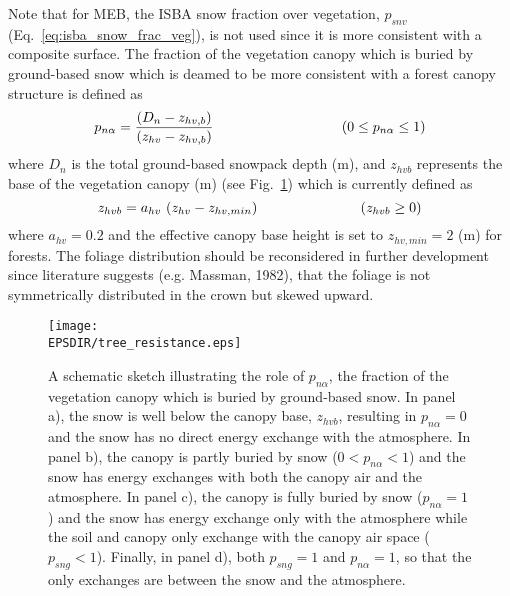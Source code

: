Note that for MEB, the ISBA snow fraction over vegetation, 
$p_{snv}$ (Eq.~\ref{eq:isba_snow_frac_veg}), 
is not used since it is
more consistent with a composite surface.
The fraction of the vegetation canopy which is buried by ground-based snow
which is deamed to be more consistent with a forest canopy structure
is defined as 
%
\begin{equation}
\label{eq:meb_LAIcansnow}
p_{n\alpha} = 
\frac
{\left(D_n - z_{hv,b}\right)}
{\left(z_{hv} - z_{hv,b}\right)}
\hskip1.25in
\left( 0 \leq  p_{n\alpha} \leq 1\right)
\end{equation}
%
where $D_n$ is the total ground-based snowpack depth (m), 
and $z_{hvb}$
represents the base of the vegetation canopy (m) 
(see Fig.~\ref{fig:forest_snow_MEB}) which is currently defined as
%
\begin{equation}
\label{eq:meb_pn_alphan}
z_{hvb} = a_{hv}\,\left(z_{hv} - z_{hv,min}\right)
\hskip1.in
\left(z_{hvb} \geq 0\right)
%
\end{equation}
%
where $a_{hv}=0.2$ and the effective canopy base height is
set to $z_{hv,min}=2$ (m) for forests. The foliage distribution
should be reconsidered in further development since literature
suggests
(e.g. Massman, 1982)\nocite{Massman1982}, 
that the foliage is not
symmetrically distributed in the crown but skewed upward.



\begin{figure}[!b]
\centerline{ 
\texttt{[image: \\EPSDIR/tree\_resistance.eps]}}
\caption{
A schematic sketch illustrating the role of $p_{n\alpha}$, the fraction of the vegetation
canopy which is buried by ground-based snow. In panel a), the snow is well
below the canopy base, $z_{hvb}$, 
resulting in $p_{n\alpha}=0$ and the snow has no direct energy exchange with the atmosphere.
In panel b), the canopy is partly buried by snow ($0<p_{n\alpha}<1$) and the snow has energy exchanges
with both the canopy air and the atmosphere.
In panel c), the canopy is fully buried by snow ($p_{n\alpha}=1$) and the snow has energy exchange
only with the atmosphere while the soil and canopy only exchange with
the canopy air space ($p_{sng}<1$). Finally, in panel d), both
$p_{sng}=1$ and $p_{n\alpha}=1$, so
that the only exchanges are between the snow and the atmosphere.
}
\label{fig:forest_snow_MEB}
\end{figure}


